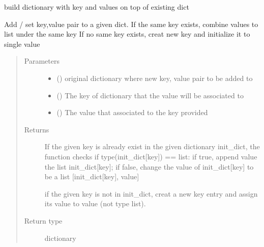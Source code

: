 \documentclass[letterpaper,10pt,english]{sphinxmanual}
\begin{document}
\begin{fulllineitems}
\label{\detokenize{scibeam.core:scibeam.core.dictfunc.buildDict}}
build dictionary with key and values on top of existing dict

Add / set key,value pair to a given dict.
If the same key exists, combine values to list under the same key
If no same key exists, creat new key and initialize it to single value
\begin{quote}\begin{description}
\item[{Parameters}] \leavevmode\begin{itemize}
\item {} 
 () \textendash{} original dictionary where new key, value pair to be added to

\item {} 
 () \textendash{} The key of dictionary that the value will be associated to

\item {} 
 () \textendash{} The value that associated to the key provided

\end{itemize}

\item[{Returns}] \leavevmode

If the given key is already exist in the given dictionary init\_dict,
the function checks if type(init\_dict{[}key{]}) == list:
if true, append value the list init\_dict{[}key{]};
if false,  change the value of init\_dict{[}key{]} to be a list
{[}init\_dict{[}key{]}, value{]}

if the given key is not in init\_dict, creat a new key entry and assign
its value to value (not type list).


\item[{Return type}] \leavevmode
dictionary

\end{description}\end{quote}

\end{fulllineitems}
\end{document}
